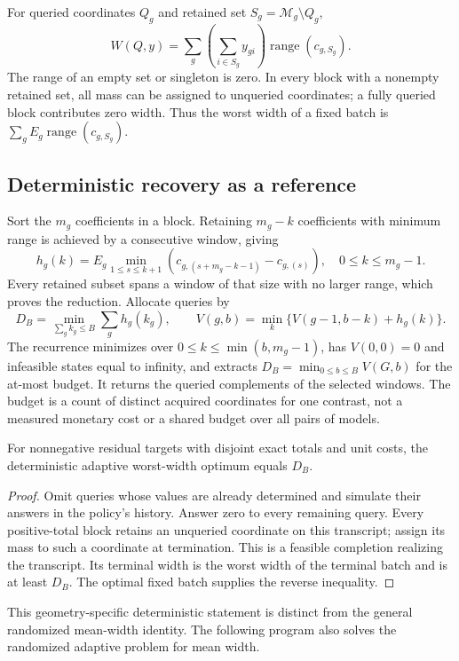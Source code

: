 For queried coordinates $Q_g$ and retained set $S_g=\mathcal M_g\setminus Q_g$,
\begin{equation}
 W(Q,y)=\sum_g\left(\sum_{i\in S_g}y_{gi}\right)
                  \operatorname{range}(c_{g,S_g}).
 \label{eq:querywidth}
\end{equation}
The range of an empty set or singleton is zero. In every block with a
nonempty retained set, all mass can be assigned to unqueried coordinates;
a fully queried block contributes zero width. Thus the worst width of a fixed batch is
$\sum_g E_g\operatorname{range}(c_{g,S_g})$.

\subsection{Deterministic recovery as a reference}
Sort the $m_g$ coefficients in a block. Retaining $m_g-k$ coefficients
with minimum range is achieved by a consecutive window, giving
\begin{equation}
 h_g(k)=E_g\min_{1\leq s\leq k+1}
       (c_{g,(s+m_g-k-1)}-c_{g,(s)}),\quad 0\leq k\leq m_g-1.
 \label{eq:window}
\end{equation}
Every retained subset spans a window of that size with no larger range,
which proves the reduction. Allocate queries by
\begin{equation}
 D_B=\min_{\sum_g k_g\leq B}\sum_g h_g(k_g),\qquad
 V(g,b)=\min_k\{V(g-1,b-k)+h_g(k)\}.
 \label{eq:allocation}
\end{equation}
The recurrence minimizes over $0\leq k\leq\min(b,m_g-1)$, has
$V(0,0)=0$ and infeasible states equal to infinity, and extracts
$D_B=\min_{0\leq b\leq B}V(G,b)$ for the at-most budget.
It returns the queried complements of the selected windows. The budget
is a count of distinct acquired coordinates for one contrast, not a
measured monetary cost or a shared budget over all pairs of models.

\begin{proposition}
\label{prop:det-adapt}
For nonnegative residual targets with disjoint exact totals and unit
costs, the deterministic adaptive worst-width optimum equals $D_B$.
\end{proposition}
\begin{proof}
Omit queries whose values are already determined and simulate their
answers in the policy's history. Answer zero to every remaining query.
Every positive-total block retains an unqueried coordinate on this
transcript; assign its mass to such a coordinate at termination. This is
a feasible completion realizing the transcript. Its terminal width is
the worst width of the terminal batch and is at least $D_B$. The optimal
fixed batch supplies the reverse inequality.
\end{proof}
This geometry-specific deterministic statement is distinct from the
general randomized mean-width identity. The following program also
solves the randomized adaptive problem for mean width.

